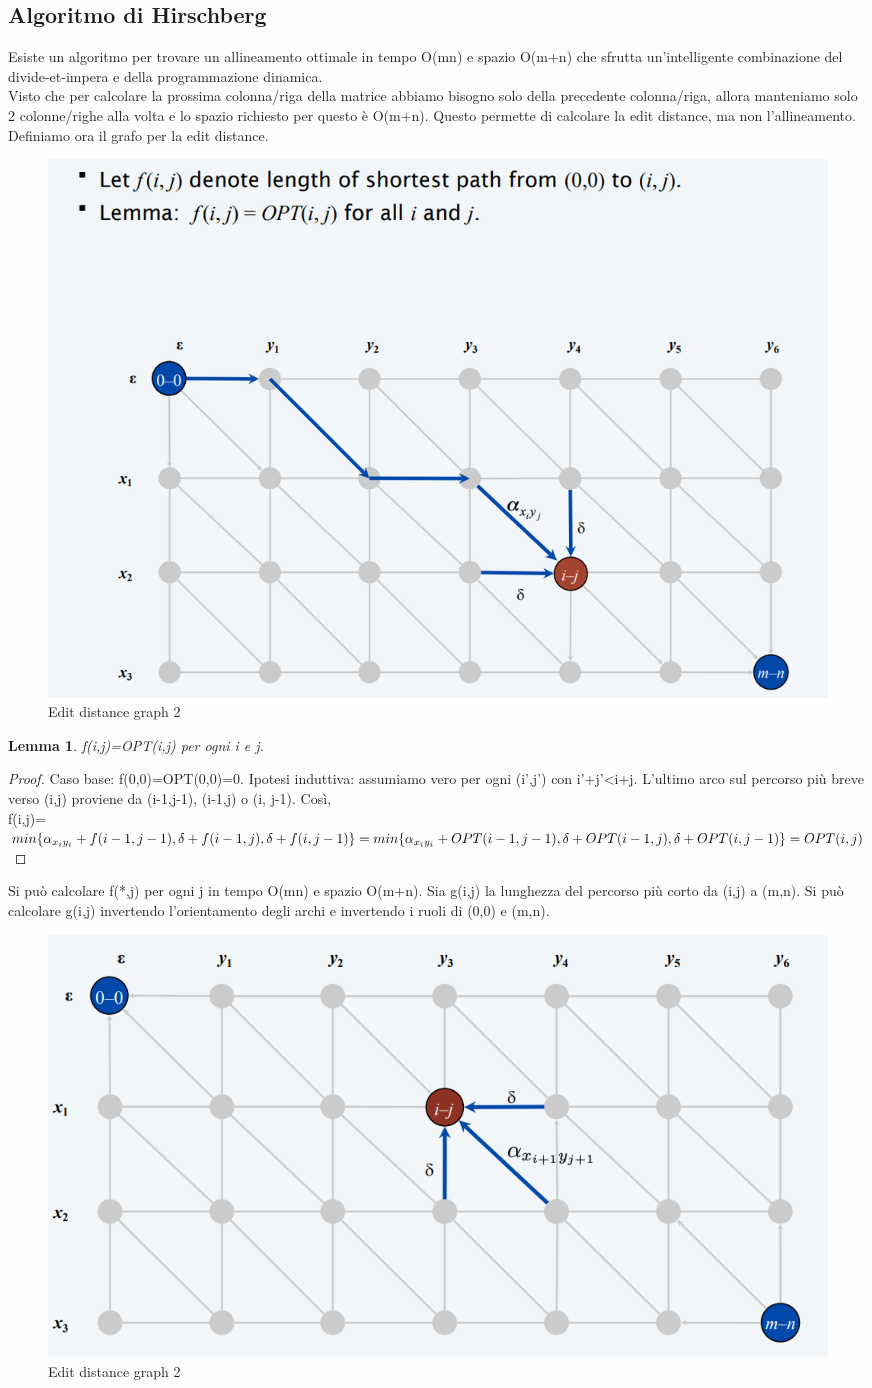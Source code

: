 \documentclass{article}
\newtheorem{lemma}{Lemma}[subsection]
\begin{document}
\subsection{Algoritmo di Hirschberg}
Esiste un algoritmo per trovare un allineamento ottimale in tempo O(mn) e spazio O(m+n) che sfrutta un'intelligente combinazione del divide-et-impera e della programmazione dinamica.\\
Visto che per calcolare la prossima colonna/riga della matrice abbiamo bisogno solo della precedente colonna/riga, allora manteniamo solo 2 colonne/righe alla volta e lo spazio richiesto per questo è O(m+n). Questo permette di calcolare la edit distance, ma non l'allineamento. Definiamo ora il grafo per la edit distance.\\
\begin{figure}[H]
    \centering
    \includegraphics[width=0.5\linewidth]{hirschberg.png}
    \caption{Edit distance graph 2}
    \label{fig:enter-label}
\end{figure}
\begin{lemma}
    f(i,j)=OPT(i,j) per ogni i e j.
\end{lemma}
\begin{proof}
    Caso base: f(0,0)=OPT(0,0)=0.
    Ipotesi induttiva: assumiamo vero per ogni (i',j') con i'+j'<i+j. L'ultimo arco sul percorso più breve verso (i,j) proviene da (i-1,j-1), (i-1,j) o (i, j-1). Così,\\
    f(i,j)=$min\{\alpha_{x_iy_i}+f(i-1, j-1), \delta+f(i-1,j), \delta+f(i,j-1)\}\\=min\{\alpha_{x_iy_i}+OPT(i-1, j-1), \delta+OPT(i-1,j), \delta+OPT(i,j-1)\}\\=OPT(i,j)$
\end{proof}
Si può calcolare f(*,j) per ogni j in tempo O(mn) e spazio O(m+n). Sia g(i,j) la lunghezza del percorso più corto da (i,j) a (m,n). Si può calcolare g(i,j) invertendo l'orientamento degli archi e invertendo i ruoli di (0,0) e (m,n).
\begin{figure} [H]
    \centering
    \includegraphics[width=0.5\linewidth]{hirschberg1.png}
    \caption{Edit distance graph 2}
    \label{fig:enter-label}
\end{figure}
\end{document}
